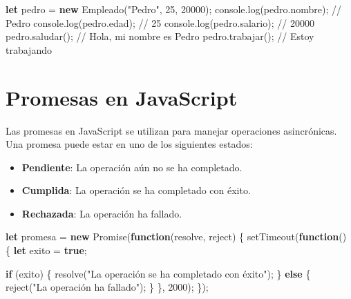\documentclass[
  a4paper,
  DIV=11,
  numbers=noendperiod,
  onepage,
  openany]{scrreprt}
\newenvironment{Shaded}{\begin{snugshade}}{\end{snugshade}}
\newcommand{\AttributeTok}[1]{\textcolor[rgb]{0.40,0.45,0.13}{#1}}
\newcommand{\BuiltInTok}[1]{\textcolor[rgb]{0.00,0.23,0.31}{#1}}
\newcommand{\CommentTok}[1]{\textcolor[rgb]{0.37,0.37,0.37}{#1}}
\newcommand{\ControlFlowTok}[1]{\textcolor[rgb]{0.00,0.23,0.31}{\textbf{#1}}}
\newcommand{\DecValTok}[1]{\textcolor[rgb]{0.68,0.00,0.00}{#1}}
\newcommand{\FunctionTok}[1]{\textcolor[rgb]{0.28,0.35,0.67}{#1}}
\newcommand{\KeywordTok}[1]{\textcolor[rgb]{0.00,0.23,0.31}{\textbf{#1}}}
\newcommand{\NormalTok}[1]{\textcolor[rgb]{0.00,0.23,0.31}{#1}}
\newcommand{\OperatorTok}[1]{\textcolor[rgb]{0.37,0.37,0.37}{#1}}
\newcommand{\PreprocessorTok}[1]{\textcolor[rgb]{0.68,0.00,0.00}{#1}}
\newcommand{\StringTok}[1]{\textcolor[rgb]{0.13,0.47,0.30}{#1}}
\providecommand{\tightlist}{%
  \setlength{\itemsep}{0pt}\setlength{\parskip}{0pt}}\usepackage{longtable,booktabs,array}
\begin{document}
\begin{tcolorbox}
\begin{Shaded}
\begin{Highlighting}[]
\KeywordTok{let}\NormalTok{ pedro }\OperatorTok{=} \KeywordTok{new} \FunctionTok{Empleado}\NormalTok{(}\StringTok{"Pedro"}\OperatorTok{,} \DecValTok{25}\OperatorTok{,} \DecValTok{20000}\NormalTok{)}\OperatorTok{;}
\BuiltInTok{console}\OperatorTok{.}\FunctionTok{log}\NormalTok{(pedro}\OperatorTok{.}\AttributeTok{nombre}\NormalTok{)}\OperatorTok{;} \CommentTok{// Pedro}
\BuiltInTok{console}\OperatorTok{.}\FunctionTok{log}\NormalTok{(pedro}\OperatorTok{.}\AttributeTok{edad}\NormalTok{)}\OperatorTok{;} \CommentTok{// 25}
\BuiltInTok{console}\OperatorTok{.}\FunctionTok{log}\NormalTok{(pedro}\OperatorTok{.}\AttributeTok{salario}\NormalTok{)}\OperatorTok{;} \CommentTok{// 20000}
\NormalTok{pedro}\OperatorTok{.}\FunctionTok{saludar}\NormalTok{()}\OperatorTok{;} \CommentTok{// Hola, mi nombre es Pedro}
\NormalTok{pedro}\OperatorTok{.}\FunctionTok{trabajar}\NormalTok{()}\OperatorTok{;} \CommentTok{// Estoy trabajando}
\end{Highlighting}
\end{Shaded}

\section{Promesas en JavaScript}\label{promesas-en-javascript}

Las promesas en JavaScript se utilizan para manejar operaciones
asincrónicas. Una promesa puede estar en uno de los siguientes estados:

\begin{itemize}
\tightlist
\item
  \textbf{Pendiente}: La operación aún no se ha completado.
\item
  \textbf{Cumplida}: La operación se ha completado con éxito.
\item
  \textbf{Rechazada}: La operación ha fallado.
\end{itemize}

\begin{Shaded}
\begin{Highlighting}[]
\KeywordTok{let}\NormalTok{ promesa }\OperatorTok{=} \KeywordTok{new} \BuiltInTok{Promise}\NormalTok{(}\KeywordTok{function}\NormalTok{(resolve}\OperatorTok{,}\NormalTok{ reject) \{}
    \PreprocessorTok{setTimeout}\NormalTok{(}\KeywordTok{function}\NormalTok{() \{}
        \KeywordTok{let}\NormalTok{ exito }\OperatorTok{=} \KeywordTok{true}\OperatorTok{;}

        \ControlFlowTok{if}\NormalTok{ (exito) \{}
            \FunctionTok{resolve}\NormalTok{(}\StringTok{"La operación se ha completado con éxito"}\NormalTok{)}\OperatorTok{;}
\NormalTok{        \} }\ControlFlowTok{else}\NormalTok{ \{}
            \FunctionTok{reject}\NormalTok{(}\StringTok{"La operación ha fallado"}\NormalTok{)}\OperatorTok{;}
\NormalTok{        \}}
\NormalTok{    \}}\OperatorTok{,} \DecValTok{2000}\NormalTok{)}\OperatorTok{;}
\NormalTok{\})}\OperatorTok{;}


\end{Highlighting}
\end{Shaded}
\end{tcolorbox}
\end{document}
